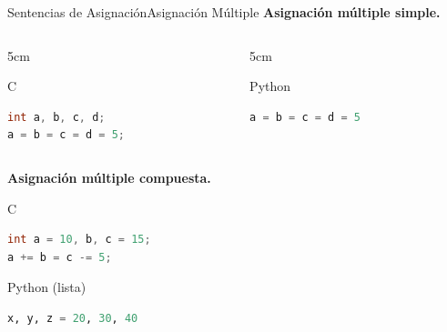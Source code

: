 \documentclass{beamer}
\begin{document}
\begin{frame}[fragile]{Sentencias de Asignación}{Asignación Múltiple}
\small
\textbf{Asignación múltiple simple.}
\begin{columns}[t]
	\begin{column}{5cm}
		\begin{exampleblock}{C}
		\begin{lstlisting}[language=C, basicstyle=\scriptsize] 
int a, b, c, d;
a = b = c = d = 5;
		\end{lstlisting}\end{exampleblock}
	\end{column}
	\begin{column}{5cm}
		\begin{block}{Python}
		\begin{lstlisting}[language=Python, basicstyle=\scriptsize]
a = b = c = d = 5
		\end{lstlisting}\end{block}
	\end{column}
\end{columns}
\vspace{.2cm}
\textbf{Asignación múltiple compuesta.}\\
\begin{exampleblock}{C}
\begin{lstlisting}[language=C, basicstyle=\scriptsize] 
int a = 10, b, c = 15;
a += b = c -= 5;
\end{lstlisting}
\end{exampleblock}
\begin{block}{Python (lista)}
\begin{lstlisting}[language=Python, basicstyle=\scriptsize]
x, y, z = 20, 30, 40
\end{lstlisting}
\end{block}
\end{frame}
\end{document}
